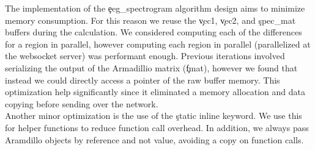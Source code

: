 The implementation of the \c{eeg\_spectrogram} algorithm design aims to
minimize memory consumption. For this reason we reuse the \c{vec1}, \c{vec2},
and \c{spec\_mat} buffers during the calculation. We considered computing each
of the differences for a region in parallel, however computing each region in
parallel (parallelized at the websocket server) was performant enough. Previous
iterations involved serializing the output of the Armadillio matrix (\c{fmat}),
however we found that instead we could directly access a pointer of the raw
buffer memory. This optimization help significantly since it eliminated a
memory allocation and data copying before sending over the network. \\

Another minor optimization is the use of the \c{static inline} keyword. We use
this for helper functions to reduce function call overhead. In addition, we
always pass Aramdillo objects by reference and not value, avoiding a copy on
function calls.

